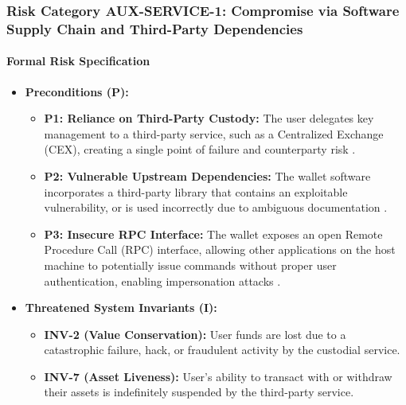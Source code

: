 \subsubsection{Risk Category AUX-SERVICE-1: Compromise via Software Supply Chain and Third-Party Dependencies}

\paragraph{Formal Risk Specification}

\begin{itemize}
    \item \textbf{Preconditions (P):}
        \begin{itemize}
            \item \textbf{P1: Reliance on Third-Party Custody:} The user delegates key management to a third-party service, such as a Centralized Exchange (CEX), creating a single point of failure and counterparty risk \cite{yu2024, suratkar2020}.
            \item \textbf{P2: Vulnerable Upstream Dependencies:} The wallet software incorporates a third-party library that contains an exploitable vulnerability, or is used incorrectly due to ambiguous documentation \cite{houy2023}.
            \item \textbf{P3: Insecure RPC Interface:} The wallet exposes an open Remote Procedure Call (RPC) interface, allowing other applications on the host machine to potentially issue commands without proper user authentication, enabling impersonation attacks \cite{houy2023}.
        \end{itemize}

    \item \textbf{Threatened System Invariants (I):}
        \begin{itemize}
            \item \textbf{INV-2 (Value Conservation):} User funds are lost due to a catastrophic failure, hack, or fraudulent activity by the custodial service.
            \item \textbf{INV-7 (Asset Liveness):} User's ability to transact with or withdraw their assets is indefinitely suspended by the third-party service.
        \end{itemize}


\end{itemize}
